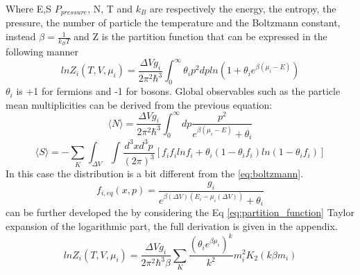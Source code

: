 \documentclass[12pt,a4paper]{book}
\begin{document}
	Where E,S $P_{pressure}$, N, T and $k_B$ are respectively the energy, the entropy, the pressure, the number of particle the temperature and the Boltzmann constant, instead $\beta=\frac{1}{k_BT}$ and Z is the partition function that can be expressed in the following manner
	\begin{equation}
		ln Z_i(T,V,\mu_i)= \frac{\Delta V g_i}{2\pi^2\hbar^3} \int_{0}^{\infty} \theta_i p^2 dp ln(1+\theta_i e^{\beta(\mu_i-E)})
		\label{eq:partition_function}
	\end{equation}
	$\theta_i$ is +1 for fermions and -1 for bosons. Global observables such as the
	particle mean multiplicities can be derived from the previous equation:
	\begin{equation}
		\langle N \rangle = \frac{\Delta V g_i}{2\pi^2\hbar^3} \int_{0}^{\infty} dp \frac{p^2}{e^{\beta(\mu_i-E)}+\theta_i} 
		\label{eq:mean_particle_number}
	\end{equation}
	\begin{equation}
	\langle S \rangle= -\sum_{K} \int_{\Delta V} \int \frac{d^3x d^3p}{(2\pi)^3} \left[f_i f_i ln f_i + \theta_i (1-\theta_if_i)ln(1-\theta_if_i) \right]
		\label{eq:entropy}
	\end{equation}
	In this case the distribution is a bit different from the \ref{eq:boltzmann}.
	\begin{equation}
		f_{i,eq}(x,p)=\frac{g_i}{e^{\beta(\Delta V)(E_i-\mu_i(\Delta V))} +\theta_i} 
		\label{eq:boltmann2}
	\end{equation}
	can be further developed the by considering the Eq \ref{eq:partition_function} Taylor expansion of the logarithmic part, the full derivation is given in the appendix.
	\begin{equation}
		ln Z_i(T,V,\mu_i)= \frac{\Delta V g_i}{2\pi^2\hbar^3\beta} \sum_{K} \frac{(\theta_i e^{\beta \mu_i})^k}{k^2} m_i^2K_2(k\beta m_i)
		\label{eq:partition_function2}
	\end{equation}
	 
\end{document}
